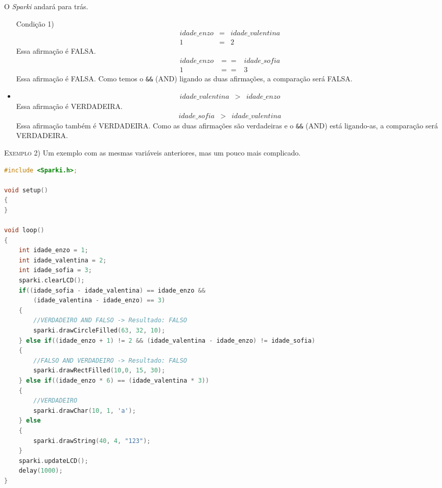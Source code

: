     
    O \textsl{Sparki} andará para trás.
    \begin{itemize}
        \item[Condição 1)]
        \begin{eqnarray}
        idade\_enzo & = & idade\_valentina\\
        1 & = & 2 \nonumber     \end{eqnarray}
        Essa afirmação é FALSA.
        \begin{eqnarray}
        idade\_enzo & == & idade\_sofia\\
        1 & == & 3 \nonumber
        \end{eqnarray}
        Essa afirmação é FALSA.
        Como temos o \lstinline[columns=fixed]{&&} (AND) ligando as duas afirmações, a comparação será FALSA.
        \item[Condição 2)]
        \begin{eqnarray}
        idade\_valentina & > & idade\_enzo
        \end{eqnarray}
        Essa afirmação é VERDADEIRA.
        \begin{eqnarray}
        idade\_sofia & > & idade\_valentina
        \end{eqnarray}
        Essa afirmação também é VERDADEIRA. Como as duas afirmações são verdadeiras e o \lstinline[columns=fixed]{&&} (AND) está ligando-as, a comparação será VERDADEIRA.
    \end{itemize} 
    
    \textsc{Exemplo 2)} Um exemplo com as mesmas variáveis anteriores, mas um pouco mais complicado.
    
    \begin{lstlisting}[language=C]
#include <Sparki.h>;

void setup()
{
}

void loop()
{
    int idade_enzo = 1;
    int idade_valentina = 2;
    int idade_sofia = 3;
    sparki.clearLCD();
    if((idade_sofia - idade_valentina) == idade_enzo &&
        (idade_valentina - idade_enzo) == 3) 
    {
        //VERDADEIRO AND FALSO -> Resultado: FALSO
        sparki.drawCircleFilled(63, 32, 10);
    } else if((idade_enzo + 1) != 2 && (idade_valentina - idade_enzo) != idade_sofia) 
    {
        //FALSO AND VERDADEIRO -> Resultado: FALSO
        sparki.drawRectFilled(10,0, 15, 30);
    } else if((idade_enzo * 6) == (idade_valentina * 3)) 
    {
        //VERDADEIRO
        sparki.drawChar(10, 1, 'a');
    } else 
    {
        sparki.drawString(40, 4, "123");
    } 
    sparki.updateLCD();
    delay(1000);
}
\end{lstlisting}

